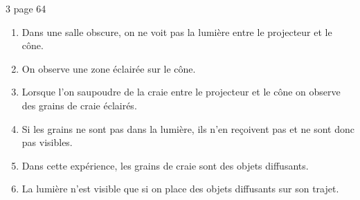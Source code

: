 \begin{myact}{3 page 64}
	\begin{enumerate}\pause
		\item Dans une salle obscure, on ne voit pas la lumière entre le projecteur et le cône.\pause
		\item On observe une zone éclairée sur le cône.\pause
		\item Lorsque l'on saupoudre de la craie entre le projecteur et le cône on observe des grains de craie éclairés.\pause
		\item Si les grains ne sont pas dans la lumière, ils n'en reçoivent pas et ne sont donc pas visibles.\pause
		\item Dans cette expérience, les grains de craie sont des objets diffusants.\pause
		\item La lumière n'est visible que si on place des objets diffusants sur son trajet.
	\end{enumerate}
\end{myact}
